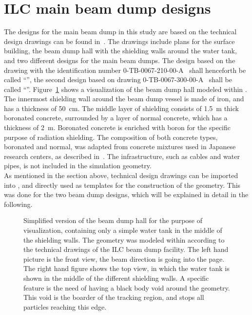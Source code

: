 \section{ILC main beam dump designs}
\label{BeamDumps:designs}
The designs for the main beam dump in this study are based on the technical design drawings can be found in~\cite{Smith_drawings}.
The drawings include plans for the surface building, the beam dump hall with the shielding walls around the water tank, and two different designs for the main beam dumps.
The design based on the drawing with the identification number 0-TB-0067-210-00-A~\cite{Smith_drawings} shall henceforth be called ``\designone'', the second design based on drawing 0-TB-0067-300-00-A~\cite{Smith_drawings} shall be called ``\designtwo''.
Figure~\ref{fig:BeamDumps:geometry} shows a visualization of the beam dump hall modeled within \flair. 
The innermost shielding wall around the beam dump vessel is made of iron, and has a thickness of \SI{50}{\centi\meter}.
The middle layer of shielding consists of \SI{1.5}{\meter} thick boronated concrete, surrounded by a layer of normal concrete, which has a thickness of \SI{2}{\meter}.
Boronated concrete is enriched with boron for the specific purpose of radiation shielding.
The composition of both concrete types, boronated and normal, was adapted from concrete mixtures used in Japanese research centers, as described in~\cite{concrete}. 
The infrastructure, such as cables and water pipes, is not included in the simulation geometry.
\\As mentioned in the section above, technical design drawings can be imported into \flair, and directly used as templates for the construction of the geometry.
This was done for the two beam dump designs, which will be explained in detail in the following.

\begin{figure}[hbp]
\begin{center}
\caption[Geometry visualization of the ILC main beam dump hall]{Simplified version of the beam dump hall for the purpose of visualization, containing only a simple water tank in the middle of the shielding walls. 
The geometry was modeled within \flair according to the technical drawings of the ILC beam dump facility.
The left hand picture is the front view, the beam direction is going into the page.
The right hand figure shows the top view, in which the water tank is shown in the middle of the different shielding walls. 
A \fluka specific feature is the need of having a black body void around the geometry. 
This void is the boarder of the tracking region, and stops all particles reaching this edge.}
\label{fig:BeamDumps:geometry}
\end{center}
\end{figure}

